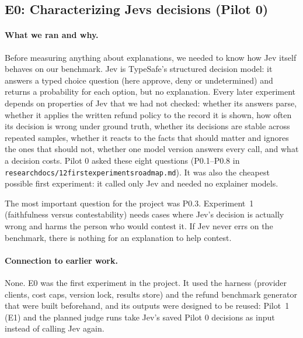 \documentclass[11pt]{article}
\renewcommand{\_}{\origunderscore\allowbreak}
\begin{document}
\subsection{E0: Characterizing Jev\textquotesingle s decisions (Pilot 0)}\label{sec:e0}

\paragraph{What we ran and why.}
Before measuring anything about explanations, we needed to know how Jev itself behaves on our benchmark. Jev is TypeSafe's structured decision model: it answers a typed choice question (here approve, deny or undetermined) and returns a probability for each option, but no explanation. Every later experiment depends on properties of Jev that we had not checked: whether its answers parse, whether it applies the written refund policy to the record it is shown, how often its decision is wrong under ground truth, whether its decisions are stable across repeated samples, whether it reacts to the facts that should matter and ignores the ones that should not, whether one model version answers every call, and what a decision costs. Pilot 0 asked these eight questions (P0.1--P0.8 in \texttt{research\_docs/12\_first\_experiments\_roadmap.md}). It was also the cheapest possible first experiment: it called only Jev and needed no explainer models.

The most important question for the project was P0.3. Experiment~1 (faithfulness versus contestability) needs cases where Jev's decision is actually wrong and harms the person who would contest it. If Jev never errs on the benchmark, there is nothing for an explanation to help contest.

\paragraph{Connection to earlier work.}
None. E0 was the first experiment in the project. It used the harness (provider clients, cost caps, version lock, results store) and the refund benchmark generator that were built beforehand, and its outputs were designed to be reused: Pilot~1 (E1) and the planned judge runs take Jev's saved Pilot 0 decisions as input instead of calling Jev again.
\end{document}
